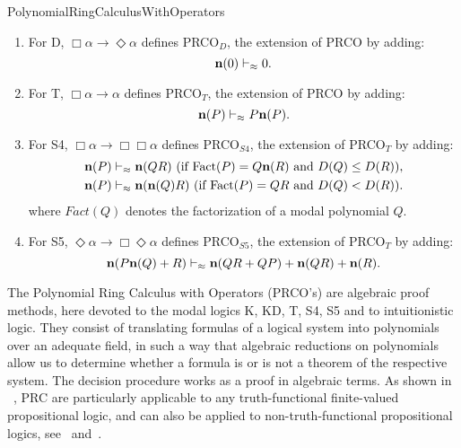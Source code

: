 \begin{entry}{PolynomialRingCalculusWithOperators}
\begin{calculus}
\begin{enumerate}
\item  For D, $\Box\alpha \to \Diamond \alpha $ defines  PRCO$_{D}$,  the extension of PRCO   by adding:
 \begin{equation*}
         \textbf{n}(0) \vdash_{\approx} 0 . 
 \end{equation*}
\item   For T, $\Box\alpha \to \alpha$ defines PRCO$_{T}$,  the extension of PRCO  by adding:
\begin{equation*}
        \textbf{n}(P) \vdash_{\approx} P \textbf{n}(P).
\end{equation*}
\item For S4, $\Box\alpha \to \Box\Box\alpha$  defines PRCO$_{S4}$, the extension of  PRCO$_T$   by adding:
\begin{align*}
        &\textbf{n}(P) \vdash_{\approx} \textbf{n}(QR) \mbox{ (if $\mbox{Fact}(P) = Q \textbf{n}(R)$ and $D(Q) \leq D(R)$)},   \\ 
        &\textbf{n}(P) \vdash_{\approx} \textbf{n}(\textbf{n}(Q)R) \mbox{ (if $\mbox{Fact}(P) = Q R$ and $D(Q) < D(R)$)}.  
 \end{align*} 
  where $Fact(Q)$ denotes the factorization of a modal polynomial $Q$.
        \item For  S5, $\Diamond\alpha \to \Box\Diamond\alpha$ defines  PRCO$_{S5}$, the extension of  PRCO$_T$   by adding:
\begin{equation*}
        \textbf{n}(P \textbf{n}(Q) + R) \vdash_{\approx} \textbf{n}(Q R + Q P) + \textbf{n}(Q R) + \textbf{n}(R). 
\end{equation*}
\end{enumerate}

\end{calculus}


\begin{clarifications}
  The Polynomial Ring Calculus with Operators (PRCO's) are algebraic proof
  methods,  here devoted to the modal logics K, KD, T, S4, S5 and to
  intuitionistic logic.  They consist of translating formulas of a logical system
  into polynomials over an adequate field, in such a way that algebraic reductions
  on polynomials allow us to determine whether a formula is or is not a theorem of
  the respective system. The decision procedure works as a proof in algebraic
  terms. As shown in ~\cite{car:2005}, PRC are particularly applicable to any
  truth-functional finite-valued propositional logic, and can also be applied to
  non-truth-functional propositional logics, see~\cite{car-mat:2014}
  and~\cite{car-mat:2015}.
\end{clarifications}


\end{entry}
